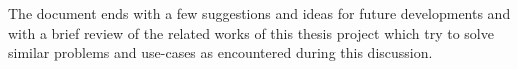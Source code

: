 The document ends with a few suggestions and ideas for future developments and with a brief review of the related works of this thesis project which try to solve similar problems and use-cases as encountered during this discussion.


\vfill
\selectthesislanguage

\setcounter{romanPage}{\value{page}}
